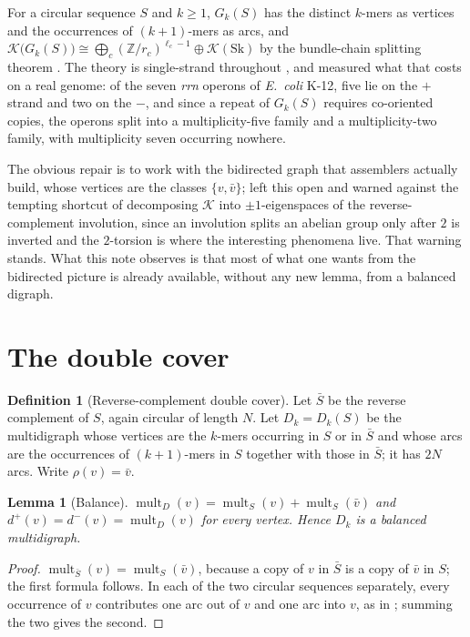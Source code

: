 \documentclass[11pt]{article}
\theoremstyle{plain}
\newtheorem{lemma}[theorem]{Lemma}
\theoremstyle{definition}
\newtheorem{definition}[theorem]{Definition}
\theoremstyle{remark}
\newcommand{\Z}{\mathbb{Z}}
\newcommand{\K}{\mathcal{K}}
\newcommand{\Sk}{\mathrm{Sk}}
\newcommand{\mult}{\operatorname{mult}}
\begin{document}
For a circular sequence $S$ and $k\ge1$, $G_k(S)$ has the distinct $k$-mers as vertices
and the occurrences of $(k{+}1)$-mers as arcs, and
$\K\bigl(G_k(S)\bigr)\cong\bigoplus_c(\Z/r_c)^{\ell_c-1}\oplus\K(\Sk)$ by the bundle-chain
splitting theorem \cite{Bio3}. The theory is single-strand throughout \cite{Bio1,Bio2,Bio3,Bio4},
and \cite{Bio5} measured what that costs on a real genome: of the seven \emph{rrn} operons
of \emph{E.\ coli} K-12, five lie on the $+$ strand and two on the $-$, and since a repeat
of $G_k(S)$ requires co-oriented copies, the operons split into a multiplicity-five family
and a multiplicity-two family, with multiplicity seven occurring nowhere.

The obvious repair is to work with the bidirected graph that assemblers actually build,
whose vertices are the classes $\{v,\bar v\}$; \cite{Bio1,Bio2} left this open and warned
against the tempting shortcut of decomposing $\K$ into $\pm1$-eigenspaces of the
reverse-complement involution, since an involution splits an abelian group only after $2$
is inverted and the $2$-torsion is where the interesting phenomena live. That warning
stands. What this note observes is that most of what one wants from the bidirected picture
is already available, without any new lemma, from a balanced digraph.

\section{The double cover}\label{sec:cover}

\begin{definition}[Reverse-complement double cover]\label{def:cover}
Let $\bar S$ be the reverse complement of $S$, again circular of length $N$. Let
$D_k=D_k(S)$ be the multidigraph whose vertices are the $k$-mers occurring in $S$ or in
$\bar S$ and whose arcs are the occurrences of $(k{+}1)$-mers in $S$ together with those
in $\bar S$; it has $2N$ arcs. Write $\rho(v)=\bar v$.
\end{definition}

\begin{lemma}[Balance]\label{lem:balance}
$\mult_{D}(v)=\mult_S(v)+\mult_S(\bar v)$ and $d^{+}(v)=d^{-}(v)=\mult_D(v)$ for every
vertex. Hence $D_k$ is a balanced multidigraph.
\end{lemma}

\begin{proof}
$\mult_{\bar S}(v)=\mult_S(\bar v)$, because a copy of $v$ in $\bar S$ is a copy of
$\bar v$ in $S$; the first formula follows. In each of the two circular sequences
separately, every occurrence of $v$ contributes one arc out of $v$ and one arc into $v$,
as in \cite[Lem.~4]{Bio1}; summing the two gives the second.
\end{proof}
\end{document}
